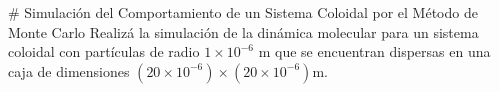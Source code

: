 # Simulación del Comportamiento de un Sistema Coloidal por el Método de Monte Carlo
Realizá la simulación de la dinámica molecular para un sistema coloidal con partículas de radio $ 1 \times 10^{-6} $ m que se encuentran dispersas en una caja de dimensiones $ (20 \times 10^{-6}) \times (20 \times 10^{-6}) $m.
